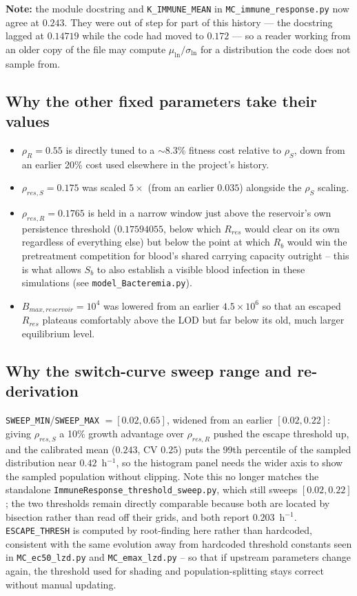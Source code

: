\documentclass[11pt]{article}
\begin{document}
\noindent \textbf{Note:} the module docstring and
\texttt{K\_IMMUNE\_MEAN} in \texttt{MC\_immune\_response.py} now agree at
$0.243$. They were out of step for part of this history --- the docstring
lagged at $0.14719$ while the code had moved to $0.172$ --- so a reader
working from an older copy of the file may compute $\mu_{\ln}/\sigma_{\ln}$
for a distribution the code does not sample from.

\subsection{Why the other fixed parameters take their values}

\begin{itemize}
\item $\rho_R = 0.55$ is directly tuned to a $\sim$8.3\% fitness cost
relative to $\rho_S$, down from an earlier 20\% cost used elsewhere in the
project's history.
\item $\rho_{res,S} = 0.175$ was scaled $5\times$ (from an earlier $0.035$)
alongside the $\rho_S$ scaling.
\item $\rho_{res,R} = 0.1765$ is held in a narrow window just above the
reservoir's own persistence threshold ($0.17594055$, below which $R_{res}$
would clear on its own regardless of everything else) but below the point
at which $R_b$ would win the pretreatment competition for blood's shared
carrying capacity outright -- this is what allows $S_b$ to also establish a
visible blood infection in these simulations (see
\texttt{model\_Bacteremia.py}).
\item $B_{max,reservoir} = 10^4$ was lowered from an earlier $4.5\times10^6$
so that an escaped $R_{res}$ plateaus comfortably above the LOD but far
below its old, much larger equilibrium level.
\end{itemize}

\subsection{Why the switch-curve sweep range and re-derivation}

\texttt{SWEEP\_MIN}/\texttt{SWEEP\_MAX} $= [0.02, 0.65]$, widened from an
earlier $[0.02, 0.22]$: giving $\rho_{res,S}$ a 10\% growth advantage over
$\rho_{res,R}$ pushed the escape threshold up, and the calibrated mean
($0.243$, CV $0.25$) puts the 99th percentile of the sampled distribution
near $0.42$~h$^{-1}$, so the histogram panel needs the wider axis to show
the sampled population without clipping. Note this no longer matches the
standalone \texttt{ImmuneResponse\_threshold\_sweep.py}, which still sweeps
$[0.02, 0.22]$; the two thresholds remain directly comparable because both
are located by bisection rather than read off their grids, and both report
$0.203$~h$^{-1}$. \texttt{ESCAPE\_THRESH} is computed by
root-finding here rather than hardcoded, consistent with the same evolution
away from hardcoded threshold constants seen in
\texttt{MC\_ec50\_lzd.py} and \texttt{MC\_emax\_lzd.py} -- so that if
upstream parameters change again, the threshold used for shading and
population-splitting stays correct without manual updating.
\end{document}
